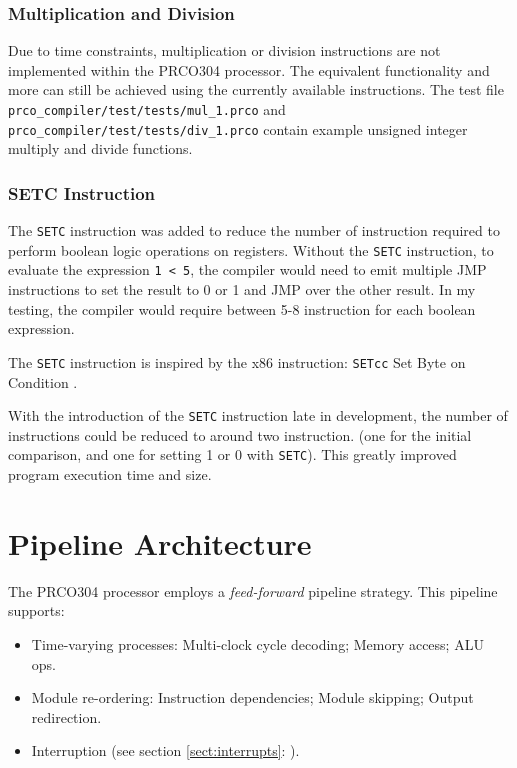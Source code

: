 \documentclass[11pt,a4paper]{report}
\newcommand{\scname}{PRCO304}
\begin{document}
\subsubsection*{Multiplication and Division}
Due to time constraints, multiplication or division instructions are not implemented within the \scname{} processor. The equivalent functionality and more can still be achieved using the currently available instructions. The test file \verb|prco_compiler/test/tests/mul_1.prco| and \verb|prco_compiler/test/tests/div_1.prco| contain example unsigned integer multiply and divide functions.

\subsubsection*{SETC Instruction}
The \verb|SETC| instruction was added to reduce the number of instruction required to perform boolean logic operations on registers. Without the \verb|SETC| instruction, to evaluate the expression \texttt{1 < 5}, the compiler would need to emit multiple JMP instructions to set the result to 0 or 1 and JMP over the other result. In my testing, the compiler would require between 5-8 instruction for each boolean expression. 

The \verb|SETC| instruction is inspired by the x86 instruction: \verb|SETcc| Set Byte on Condition \cite{isa_x86}.

With the introduction of the \verb|SETC| instruction late in development, the number of instructions could be reduced to around two instruction. (one for the initial comparison, and one for setting 1 or 0 with \verb|SETC|). This greatly improved program execution time and size.


\section{Pipeline Architecture}
The \scname{} processor employs a \textit{feed-forward} pipeline strategy. 
This pipeline supports:
\begin{itemize}
\item{Time-varying processes: Multi-clock cycle decoding; Memory access; ALU ops.}
\item{Module re-ordering: Instruction dependencies; Module skipping; Output redirection. }
\item{Interruption (see section \ref{sect:interrupts}: {}).}
\end{itemize}
\end{document}
